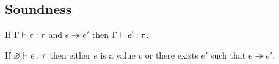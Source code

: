 \subsection{Soundness}
\begin{lem}
If $\Gamma  \vdash  \mathit{e}  :  \tau$ and $e  \twoheadrightarrow  e'$ then $\Gamma  \vdash  \mathit{e'}  :  \tau$.
\end{lem}

\begin{lem}[Progress]
If $\varnothing  \vdash  \mathit{e}  :  \tau$ then either $e$ is a value $v$ or there exists $e'$ such that $e  \twoheadrightarrow  e'$.
\end{lem}

